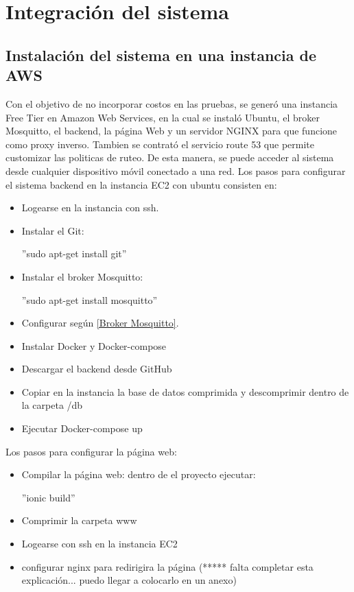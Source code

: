 \pagebreak

\section{Integración del sistema}
\subsection{Instalación del sistema en una instancia de AWS}
Con el objetivo de no incorporar costos en las pruebas, se generó una instancia Free Tier en Amazon Web Services, en la cual se instaló Ubuntu, el broker Mosquitto, el backend, la página Web y un servidor NGINX para que funcione como proxy inverso. Tambien se contrató el servicio route 53 que permite customizar las politicas de ruteo.
De esta manera, se puede acceder al sistema desde cualquier dispositivo móvil conectado a una red.
Los pasos para configurar el sistema backend en la instancia EC2 con ubuntu consisten en:

\begin{itemize}
\item Logearse en la instancia con ssh.
\item Instalar el Git:

	''sudo apt-get install git''
\item Instalar el broker Mosquitto:
	
	''sudo apt-get install mosquitto''
\item Configurar según \ref{Broker Mosquitto}.
\item Instalar Docker y Docker-compose
\item Descargar el backend desde GitHub
\item Copiar en la instancia la base de datos comprimida y descomprimir dentro de la carpeta /db
\item Ejecutar Docker-compose up
\end{itemize}

Los pasos para configurar la página web:
\begin{itemize}
\item Compilar la página web: dentro de el proyecto ejecutar:

''ionic build''
\item Comprimir la carpeta www
\item Logearse con ssh en la instancia EC2
\item configurar nginx para redirigira la página (***** falta completar esta explicación... puedo llegar a colocarlo en un anexo)

\end{itemize}
